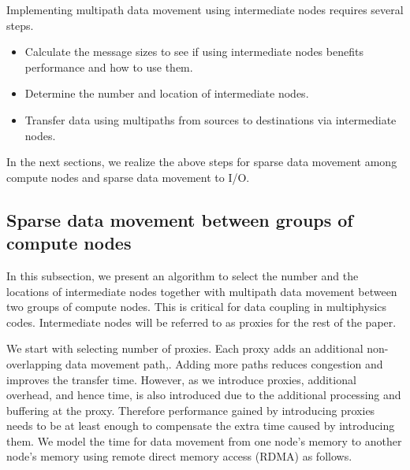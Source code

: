\documentclass[final,5p,times]{elsarticle}
\begin{document}
Implementing multipath data movement using intermediate nodes requires several steps.
\begin{itemize}
\item Calculate the message sizes to see if using intermediate nodes benefits performance and how to use them.
\item Determine the number and location of intermediate nodes.
\item Transfer data using multipaths from sources to destinations via intermediate nodes.
\end{itemize}

In the next sections, we realize the above steps for sparse data movement among compute nodes and sparse data movement to I/O.

\subsection{Sparse data movement between groups of compute nodes}
In this subsection, we present an algorithm to select the number and the locations of intermediate nodes together with multipath data movement between two groups of compute nodes. This is critical for data coupling in multiphysics codes. Intermediate nodes will be referred to as proxies for the rest of the paper. 

We start with selecting number of proxies. Each proxy adds an additional non-overlapping data movement path,. Adding more paths reduces congestion and improves the transfer time. However, as we introduce proxies, additional overhead, and hence time, is also introduced due to the additional processing and buffering at the proxy. Therefore performance gained by introducing proxies needs to be at least enough to compensate the extra time caused by introducing them. We model the time for data movement from one node's memory to another node's memory using remote direct memory access (RDMA) as follows.
\end{document}
